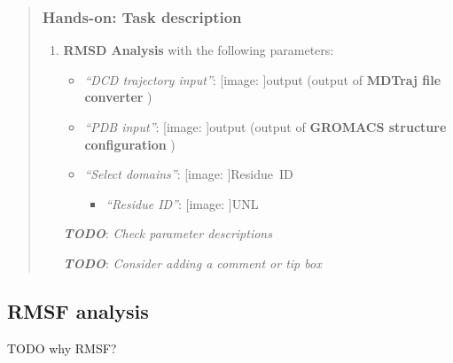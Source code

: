 \documentclass[twocolumn]{bmcart}%
\def\texttt{[image: ]}
\providecommand{\tightlist}{%
  \setlength{\itemsep}{0pt}\setlength{\parskip}{0pt}}
\begin{document}
\begin{quote}
\hypertarget{hands-on-task-description-11}{%
\subsubsection{Hands-on: Task
description}\label{hands-on-task-description-11}}

\begin{enumerate}
\def\labelenumi{\arabic{enumi}.}
\tightlist
\item
  \textbf{RMSD Analysis} with the following parameters:

  \begin{itemize}
  \tightlist
  \item
    \emph{``DCD trajectory input''}: \texttt{output} (output of
    \textbf{MDTraj file converter} )
  \item
    \emph{``PDB input''}: \texttt{output} (output of \textbf{GROMACS
    structure configuration} )
  \item
    \emph{``Select domains''}: \texttt{Residue\ ID}

    \begin{itemize}
    \tightlist
    \item
      \emph{``Residue ID''}: \texttt{UNL}
    \end{itemize}
  \end{itemize}

  \textbf{\emph{TODO}}: \emph{Check parameter descriptions}

  \textbf{\emph{TODO}}: \emph{Consider adding a comment or tip box}
\end{enumerate}


\end{quote}



\hypertarget{rmsf-analysis}{%
\subsection{RMSF analysis}\label{rmsf-analysis}}

TODO why RMSF?
\end{document}
